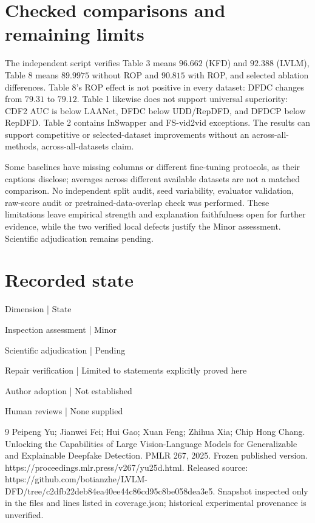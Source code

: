 \documentclass[10pt]{article}
\begin{document}
\section*{Checked comparisons and remaining limits}
The independent script verifies Table 3 means \(96.662\) (KFD) and \(92.388\) (LVLM), Table 8 means \(89.9975\) without ROP and \(90.815\) with ROP, and selected ablation differences. Table 8’s ROP effect is not positive in every dataset: DFDC changes from \(79.31\) to \(79.12\). Table 1 likewise does not support universal superiority: CDF2 AUC is below LAANet, DFDC below UDD/RepDFD, and DFDCP below RepDFD. Table 2 contains InSwapper and FS-vid2vid exceptions. The results can support competitive or selected-dataset improvements without an across-all-methods, across-all-datasets claim.\par
Some baselines have missing columns or different fine-tuning protocols, as their captions disclose; averages across different available datasets are not a matched comparison. No independent split audit, seed variability, evaluator validation, raw-score audit or pretrained-data-overlap check was performed. These limitations leave empirical strength and explanation faithfulness open for further evidence, while the two verified local defects justify the Minor assessment. Scientific adjudication remains pending.\par
\section*{Recorded state}
Dimension | State\par
Inspection assessment | Minor\par
Scientific adjudication | Pending\par
Repair verification | Limited to statements explicitly proved here\par
Author adoption | Not established\par
Human reviews | None supplied\par
9 Peipeng Yu; Jianwei Fei; Hui Gao; Xuan Feng; Zhihua Xia; Chip Hong Chang. Unlocking the Capabilities of Large Vision-Language Models for Generalizable and Explainable Deepfake Detection. PMLR 267, 2025. Frozen published version. https://proceedings.mlr.press/v267/yu25d.html. Released source: https://github.com/botianzhe/LVLM-DFD/tree/c2dfb22deb84ea40ee44c86cd95c8be058dea3e5. Snapshot inspected only in the files and lines listed in coverage.json; historical experimental provenance is unverified.\par
\end{document}
